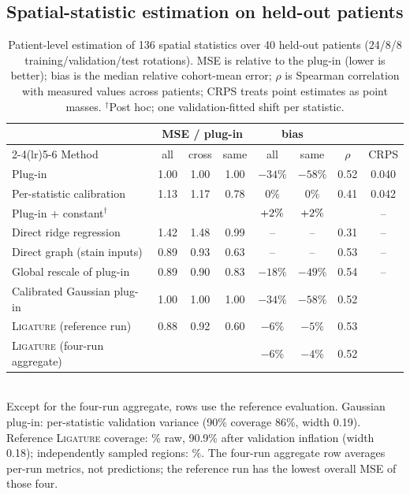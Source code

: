 \documentclass[10pt,letterpaper]{article}
\theoremstyle{definition}
\theoremstyle{remark}
\newcommand{\method}{\textnormal{\textsc{Ligature}}}
\begin{document}
\subsection{Spatial-statistic estimation on held-out patients}
\begin{table}[t]
\centering
\caption{Patient-level estimation of 136 spatial statistics over 40 held-out patients (24/8/8 training/validation/test rotations). MSE is relative to the plug-in (lower is better); bias is the median relative cohort-mean error; $\rho$ is Spearman correlation with measured values across patients; CRPS treats point estimates as point masses. $^\dagger$Post hoc; one validation-fitted shift per statistic.}
\label{tab:main}
\begin{tabular}{@{}lccccccc@{}}
\toprule
& \multicolumn{3}{c}{MSE / plug-in} & \multicolumn{2}{c}{bias} & & \\
\cmidrule(lr){2-4}\cmidrule(lr){5-6}
Method & all & cross & same & all & same & $\rho$ & CRPS \\
\midrule
Plug-in & 1.00 & 1.00 & 1.00 & $-34\%$ & $-58\%$ & 0.52 & 0.040 \\
Per-statistic calibration & 1.13 & 1.17 & 0.78 & $0\%$ & $0\%$ & 0.41 & 0.042 \\
Plug-in + constant$^\dagger$ & \BaseRefConstAll{} & \BaseRefConstCross{} & \BaseRefConstSame{} & $+2\%$ & $+2\%$ & \BaseRefConstRho{} & -- \\
Direct ridge regression & 1.42 & 1.48 & 0.99 & -- & -- & 0.31 & -- \\
Direct graph (stain inputs) & 0.89 & 0.93 & 0.63 & -- & -- & 0.53 & -- \\
Global rescale of plug-in & 0.89 & 0.90 & 0.83 & $-18\%$ & $-49\%$ & 0.54 & -- \\
Calibrated Gaussian plug-in & 1.00 & 1.00 & 1.00 & $-34\%$ & $-58\%$ & 0.52 & \GaussianCRPS{} \\
\method{} (reference run) & 0.88 & 0.92 & 0.60 & $-6\%$ & $-5\%$ & 0.53 & \RefCRPS{} \\
\method{} (four-run aggregate) & \SeedAllMSE{} & \SeedCrossMSE{} & \SeedSameMSE{} & $-6\%$ & $-4\%$ & 0.52 & \AggregateCRPS{} \\
\bottomrule
\end{tabular}\\[3pt]
Except for the four-run aggregate, rows use the reference evaluation. Gaussian plug-in: per-statistic validation variance (90\% coverage 86\%, width 0.19). Reference \method{} coverage: \RefCoverage\% raw, 90.9\% after validation inflation (width 0.18); independently sampled regions: \IndependentCoverage\%. The four-run aggregate row averages per-run metrics, not predictions; the reference run has the lowest overall MSE of those four.
\end{table}
\end{document}
